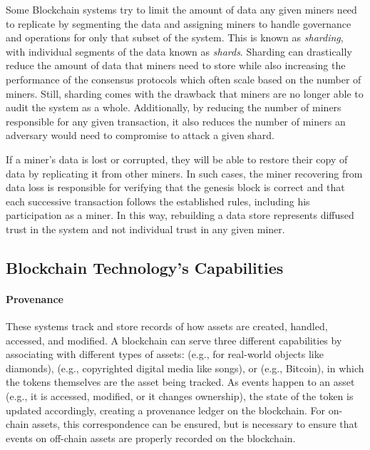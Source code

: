 Some Blockchain systems try to limit the amount of data any given miners need to replicate by segmenting the data and assigning miners to handle governance and operations for only that subset of the system.
This is known as \emph{sharding}, with individual segments of the data known as \emph{shards}.
Sharding can drastically reduce the amount of data that miners need to store while also increasing the performance of the consensus protocols which often scale based on the number of miners.
Still, sharding comes with the drawback that miners are no longer able to audit the system as a whole.
Additionally, by reducing the number of miners responsible for any given transaction, it also reduces the number of miners an adversary would need to compromise to attack a given shard.

If a miner's data is lost or corrupted, they will be able to restore their copy of data by replicating it from other miners.
In such cases, the miner recovering from data loss is responsible for verifying that the genesis block is correct and that each successive transaction follows the established rules, including his participation as a miner.
In this way, rebuilding a data store represents diffused trust in the system and not individual trust in any given miner.

\subsection{Blockchain Technology's Capabilities}

\paragraph{Provenance} These systems track and store records of how assets are created, handled, accessed, and modified. A blockchain can serve three different capabilities by associating  with different types of assets:  (e.g., for real-world objects like diamonds),  (e.g., copyrighted digital media like songs), or  (e.g., Bitcoin), in which the tokens themselves are the asset being tracked. As events happen to an asset (e.g., it is accessed, modified, or it changes ownership), the state of the token is updated accordingly, creating a provenance ledger on the blockchain. For on-chain assets, this correspondence can be ensured, but  is necessary to ensure that events on off-chain assets are properly recorded on the blockchain.

